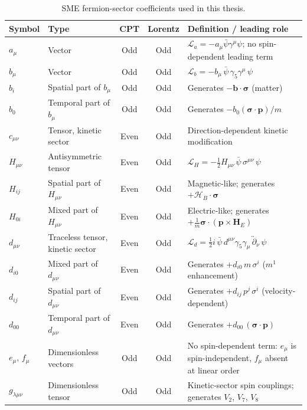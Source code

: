 \begin{table}[h]
\centering
\small
\begin{tabular}{@{}llcc>{\raggedright\arraybackslash}p{5.5cm}@{}}
\toprule
Symbol & Type & CPT & Lorentz & Definition / leading role \\
\midrule
$a_\mu$ & Vector & Odd & Odd & $\mathcal L_a=-a_\mu\bar\psi\gamma^\mu\psi$; no spin-dependent leading term \\
$b_\mu$ & Vector & Odd & Odd & $\mathcal L_b=-b_\mu\,\bar\psi\,\gamma_5\gamma^\mu\,\psi$ \\
$b_i$ & Spatial part of $b_\mu$ & Odd & Odd & Generates $-\mathbf b\cdot\boldsymbol\sigma$ (matter) \\
$b_0$ & Temporal part of $b_\mu$ & Odd & Odd & Generates $-b_0(\boldsymbol\sigma\cdot\mathbf p)/m$ \\
$c_{\mu\nu}$ & Tensor, kinetic sector & Even & Odd & Direction-dependent kinetic modification \\
$H_{\mu\nu}$ & Antisymmetric tensor & Even & Odd & $\mathcal L_H=-\tfrac12 H_{\mu\nu}\,\bar\psi\,\sigma^{\mu\nu}\,\psi$ \\
$H_{ij}$ & Spatial part of $H_{\mu\nu}$ & Even & Odd & Magnetic-like; generates $+\boldsymbol{\mathcal H}_B\cdot\boldsymbol\sigma$ \\
$H_{0i}$ & Mixed part of $H_{\mu\nu}$ & Even & Odd & Electric-like; generates $+\tfrac1m\boldsymbol\sigma\cdot(\mathbf p\times\mathbf H_E)$ \\
$d_{\mu\nu}$ & Traceless tensor, kinetic sector & Even & Odd & $\mathcal L_d=\tfrac12 i\,\bar\psi\,d^{\mu\nu}\gamma_5\gamma_\mu\,\overleftrightarrow\partial_\nu\,\psi$ \\
$d_{i0}$ & Mixed part of $d_{\mu\nu}$ & Even & Odd & Generates $+d_{i0}\,m\,\sigma^i$ ($m^1$ enhancement) \\
$d_{ij}$ & Spatial part of $d_{\mu\nu}$ & Even & Odd & Generates $+d_{ij}\,p^j\,\sigma^i$ (velocity-dependent) \\
$d_{00}$ & Temporal part of $d_{\mu\nu}$ & Even & Odd & Generates $+d_{00}\,(\boldsymbol\sigma\cdot\mathbf p)$ \\
$e_\mu,\,f_\mu$ & Dimensionless vectors & Odd & Odd & No spin-dependent term: $e_\mu$ is spin-independent, $f_\mu$ absent at linear order \\
$g_{\lambda\mu\nu}$ & Dimensionless tensor & Odd & Odd & Kinetic-sector spin couplings; generates $V_2$, $V_7$, $V_8$ \\
\bottomrule
\end{tabular}
\caption{SME fermion-sector coefficients used in this thesis.}
\label{tab:app-sme}
\end{table}

